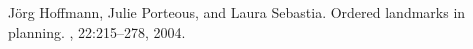 \begin{thebibliography}{10}
\footnotesize

Jörg Hoffmann, Julie Porteous, and Laura Sebastia.
\newblock Ordered landmarks in planning.
, 22:215--278, 2004.
\end{thebibliography}
